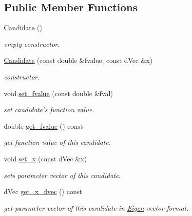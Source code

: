 \subsection*{Public Member Functions}
\begin{DoxyCompactItemize}
\item 
\hypertarget{classlibcmaes_1_1Candidate_a40fca2abb2e1bcec470a79fa5ae6525f}{\hyperlink{classlibcmaes_1_1Candidate_a40fca2abb2e1bcec470a79fa5ae6525f}{Candidate} ()}\label{classlibcmaes_1_1Candidate_a40fca2abb2e1bcec470a79fa5ae6525f}

\begin{DoxyCompactList}\small\item\em empty constructor. \end{DoxyCompactList}\item 
\hyperlink{classlibcmaes_1_1Candidate_aa15c585a460bcc7e0537b8f8defea205}{Candidate} (const double \&fvalue, const d\+Vec \&x)
\begin{DoxyCompactList}\small\item\em constructor. \end{DoxyCompactList}\item 
void \hyperlink{classlibcmaes_1_1Candidate_abdd1a7661c05f4cf236925bcf2b7f0cc}{set\+\_\+fvalue} (const double \&fval)
\begin{DoxyCompactList}\small\item\em set candidate's function value. \end{DoxyCompactList}\item 
double \hyperlink{classlibcmaes_1_1Candidate_aeca2ab3de5182036093745ec7f82834d}{get\+\_\+fvalue} () const 
\begin{DoxyCompactList}\small\item\em get function value of this candidate. \end{DoxyCompactList}\item 
void \hyperlink{classlibcmaes_1_1Candidate_a4a668920522fa13235fd7feb64aae6b8}{set\+\_\+x} (const d\+Vec \&x)
\begin{DoxyCompactList}\small\item\em sets parameter vector of this candidate. \end{DoxyCompactList}\item 
d\+Vec \hyperlink{classlibcmaes_1_1Candidate_a6155af392159bfc4d10722a7a0abf420}{get\+\_\+x\+\_\+dvec} () const 
\begin{DoxyCompactList}\small\item\em get parameter vector of this candidate in \hyperlink{namespaceEigen}{Eigen} vector format. \end{DoxyCompactList}\item 

\end{DoxyCompactItemize}
